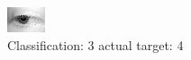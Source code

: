 \begin{figure}[h!]
\begin{center}
\includegraphics[width=0.60\columnwidth]{figures/ID2601_class_3_target_4.png}
\end{center}
\caption{ Classification: 3 actual target: 4}
\label{fig:ID2601_class_3_target_4}
\end{figure}
